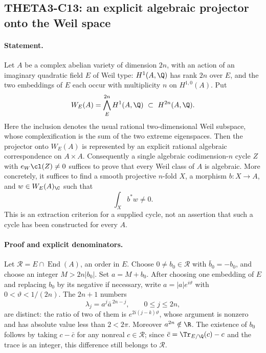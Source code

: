 \subsection{THETA3-C13: an explicit algebraic projector onto the Weil space}\label{C13}

\paragraph{Statement.}
Let $A$ be a complex abelian variety of dimension $2n$, with an action of
an imaginary quadratic field $E$ of Weil type: $H^1(A,\Q)$ has rank
$2n$ over $E$, and the two embeddings of $E$ each occur with multiplicity
$n$ on $H^{1,0}(A)$. Put
\[
 W_E(A)=\bigwedge_E^{2n}H^1(A,\Q)\ \subset\ H^{2n}(A,\Q).
\]
Here the inclusion denotes the usual rational two-dimensional Weil
subspace, whose complexification is the sum of the two extreme
eigenspaces. Then the projector onto $W_E(A)$ is represented by an
explicit rational algebraic correspondence on $A\times A$.
Consequently a single algebraic codimension-$n$ cycle $Z$ with
$e_W\cl(Z)\ne0$ suffices to prove that every Weil class of $A$ is
algebraic. More concretely, it suffices to find a smooth projective
$n$-fold $X$, a morphism $b:X\to A$, and $w\in W_E(A)_{\C}$ such that
\begin{equation}\label{C13-period}
 \int_X b^*w\ne0.
\end{equation}
This is an extraction criterion for a supplied cycle, not an assertion
that such a cycle has been constructed for every $A$.

\paragraph{Proof and explicit denominators.}
Let $\mathcal R=E\cap\operatorname{End}(A)$, an order in $E$.
Choose $0\ne b_0\in\mathcal R$ with $\bar b_0=-b_0$, and choose an
integer $M>2n|b_0|$. Set $a=M+b_0$. After choosing one embedding of
$E$ and replacing $b_0$ by its negative if necessary, write
$a=|a|e^{i\vartheta}$ with $0<\vartheta<1/(2n)$.
The $2n+1$ numbers
\[
 \lambda_j=a^j\bar a^{\,2n-j},\qquad 0\le j\le2n,
\]
are distinct: the ratio of two of them is
$e^{2i(j-k)\vartheta}$, whose argument is nonzero and has absolute
value less than $2<2\pi$. Moreover $a^{2n}\notin\R$.
The existence of $b_0$ follows by taking $c-\bar c$ for any nonreal
$c\in\mathcal R$; since $\bar c=\Tr_{E/\Q}(c)-c$ and the trace is an
integer, this difference still belongs to $\mathcal R$.

